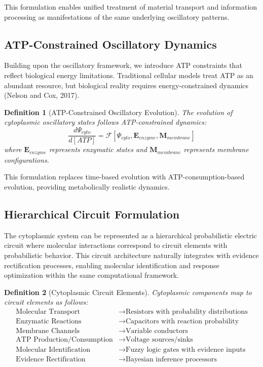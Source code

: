 \documentclass[12pt,a4paper]{article}
\newtheorem{definition}{Definition}
\begin{document}
This formulation enables unified treatment of material transport and information processing as manifestations of the same underlying oscillatory patterns.

\subsection{ATP-Constrained Oscillatory Dynamics}

Building upon the oscillatory framework, we introduce ATP constraints that reflect biological energy limitations. Traditional cellular models treat ATP as an abundant resource, but biological reality requires energy-constrained dynamics (Nelson and Cox, 2017).

\begin{definition}[ATP-Constrained Oscillatory Evolution]
The evolution of cytoplasmic oscillatory states follows ATP-constrained dynamics:
\begin{equation}
\frac{d\Psi_{cyto}}{d[ATP]} = \mathcal{F}[\Psi_{cyto}, \mathbf{E}_{enzyme}, \mathbf{M}_{membrane}]
\end{equation}
where $\mathbf{E}_{enzyme}$ represents enzymatic states and $\mathbf{M}_{membrane}$ represents membrane configurations.
\end{definition}

This formulation replaces time-based evolution with ATP-consumption-based evolution, providing metabolically realistic dynamics.

\subsection{Hierarchical Circuit Formulation}

The cytoplasmic system can be represented as a hierarchical probabilistic electric circuit where molecular interactions correspond to circuit elements with probabilistic behavior. This circuit architecture naturally integrates with evidence rectification processes, enabling molecular identification and response optimization within the same computational framework.

\begin{definition}[Cytoplasmic Circuit Elements]
Cytoplasmic components map to circuit elements as follows:
\begin{align}
\text{Molecular Transport} &\rightarrow \text{Resistors with probability distributions} \\
\text{Enzymatic Reactions} &\rightarrow \text{Capacitors with reaction probability} \\
\text{Membrane Channels} &\rightarrow \text{Variable conductors} \\
\text{ATP Production/Consumption} &\rightarrow \text{Voltage sources/sinks} \\
\text{Molecular Identification} &\rightarrow \text{Fuzzy logic gates with evidence inputs} \\
\text{Evidence Rectification} &\rightarrow \text{Bayesian inference processors}
\end{align}
\end{definition}
\end{document}
